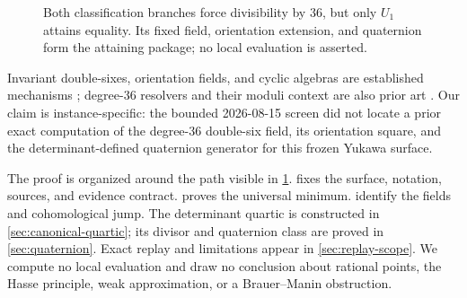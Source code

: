 \begin{figure}[t]
\centering
\setlength{\fboxsep}{8pt}
\caption{Both classification branches force divisibility by \(36\), but only
\(U_1\) attains equality.  Its fixed field, orientation extension, and
quaternion form the attaining package; no local evaluation is asserted.}
\label{fig:field-subgroup}
\end{figure}

Invariant double-sixes, orientation fields, and cyclic algebras are
established mechanisms
\cite{ElsenhansJahnel2010Brauer,ElsenhansJahnel2010DoubleSix}; degree-\(36\)
resolvers and their moduli context are also prior art
\cite{ElsenhansJahnel2012OrderThree,FarbWolfson2019}.  Our claim is
instance-specific: the bounded 2026-08-15 screen did not locate a prior exact
computation of the degree-36 double-six field, its orientation square, and
the determinant-defined quaternion generator for this frozen Yukawa surface.

The proof is organized around the path visible in
\cref{fig:field-subgroup}.   fixes the surface,
notation, sources, and evidence contract.   proves
the universal minimum.  
identify the fields and cohomological jump.  The determinant quartic is
constructed in \cref{sec:canonical-quartic}; its divisor and quaternion class
are proved in \cref{sec:quaternion}.  Exact replay and limitations appear in
\cref{sec:replay-scope}.  We compute no local evaluation and draw no
conclusion about rational points, the Hasse principle, weak approximation, or
a Brauer--Manin obstruction.
